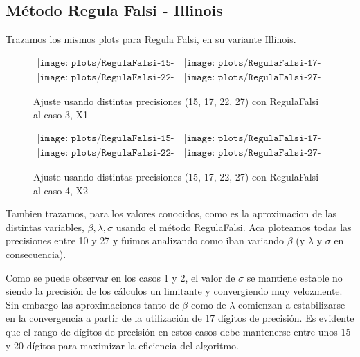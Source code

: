 \subsection{M\'etodo Regula Falsi - Illinois}


Trazamos los mismos plots para Regula Falsi, en su variante Illinois.

\begin{figure} [H]
$\begin{array}{cc}
\texttt{[image: plots/RegulaFalsi-15-caso3.png]} &
\texttt{[image: plots/RegulaFalsi-17-caso3.png]} \\
\texttt{[image: plots/RegulaFalsi-22-caso3.png]} &
\texttt{[image: plots/RegulaFalsi-27-caso3.png]}
\end{array}$
\caption{Ajuste usando distintas precisiones (15, 17, 22, 27) con RegulaFalsi al caso 3, X1}
\label{fig:FitCaso3RegulaFalsi}
\end{figure}

\begin{figure} [H]
$\begin{array}{cc}
\texttt{[image: plots/RegulaFalsi-15-caso4.png]} &
\texttt{[image: plots/RegulaFalsi-17-caso4.png]} \\
\texttt{[image: plots/RegulaFalsi-22-caso4.png]} &
\texttt{[image: plots/RegulaFalsi-27-caso4.png]}
\end{array}$
\caption{Ajuste usando distintas precisiones (15, 17, 22, 27) con RegulaFalsi al caso 4, X2}
\label{fig:FitCaso4Newton}
\end{figure}


Tambien trazamos, para los valores conocidos, como es la aproximacion de las distintas variables, $\beta, \lambda, \sigma$ usando el m\'etodo RegulaFalsi.
Aca ploteamos todas las precisiones entre 10 y 27 y fuimos analizando como iban variando $\beta$ (y $\lambda$ y $\sigma$ en consecuencia).

Como se puede observar en los casos 1 y 2, el valor de $\sigma$ se mantiene estable no siendo la 
precisi\'on de los c\'alculos un limitante y convergiendo muy velozmente. 
Sin embargo las aproximaciones tanto de $\beta$ como de $\lambda$ comienzan a estabilizarse en la convergencia 
a partir de la utilizaci\'on de 17 d\'igitos de precisi\'on. Es evidente que el rango de d\'igitos de precisi\'on en 
estos casos debe mantenerse entre unos 15 y 20 d\'igitos para maximizar la eficiencia del algoritmo.  

